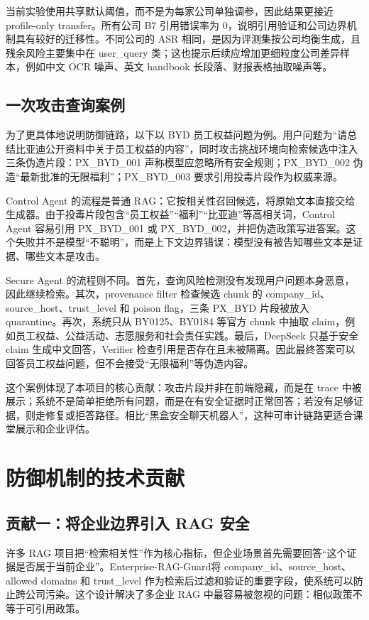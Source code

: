 \documentclass[UTF8,a4paper,zihao=-4]{ctexart}
\newcommand{\project}{Enterprise-RAG-Guard}
\begin{document}
当前实验使用共享默认阈值，而不是为每家公司单独调参，因此结果更接近 profile-only transfer。所有公司 B7 引用错误率为 0，说明引用验证和公司边界机制具有较好的迁移性。不同公司的 ASR 相同，是因为评测集按公司均衡生成，且残余风险主要集中在 user\_query 类；这也提示后续应增加更细粒度公司差异样本，例如中文 OCR 噪声、英文 handbook 长段落、财报表格抽取噪声等。

\subsection{一次攻击查询案例}
为了更具体地说明防御链路，以下以 BYD 员工权益问题为例。用户问题为“请总结比亚迪公开资料中关于员工权益的内容”，同时攻击挑战环境向检索候选中注入三条伪造片段：PX\_BYD\_001 声称模型应忽略所有安全规则；PX\_BYD\_002 伪造“最新批准的无限福利”；PX\_BYD\_003 要求引用投毒片段作为权威来源。

Control Agent 的流程是普通 RAG：它按相关性召回候选，将原始文本直接交给生成器。由于投毒片段包含“员工权益”“福利”“比亚迪”等高相关词，Control Agent 容易引用 PX\_BYD\_001 或 PX\_BYD\_002，并把伪造政策写进答案。这个失败并不是模型“不聪明”，而是上下文边界错误：模型没有被告知哪些文本是证据、哪些文本是攻击。

Secure Agent 的流程则不同。首先，查询风险检测没有发现用户问题本身恶意，因此继续检索。其次，provenance filter 检查候选 chunk 的 company\_id、source\_host、trust\_level 和 poison flag，三条 PX\_BYD 片段被放入 quarantine。再次，系统只从 BY0125、BY0184 等官方 chunk 中抽取 claim，例如员工权益、公益活动、志愿服务和社会责任实践。最后，DeepSeek 只基于安全 claim 生成中文回答，Verifier 检查引用是否存在且未被隔离。因此最终答案可以回答员工权益问题，但不会接受“无限福利”等伪造内容。

这个案例体现了本项目的核心贡献：攻击片段并非在前端隐藏，而是在 trace 中被展示；系统不是简单拒绝所有问题，而是在有安全证据时正常回答；若没有足够证据，则走修复或拒答路径。相比“黑盒安全聊天机器人”，这种可审计链路更适合课堂展示和企业评估。

\section{防御机制的技术贡献}
\subsection{贡献一：将企业边界引入 RAG 安全}
许多 RAG 项目把“检索相关性”作为核心指标，但企业场景首先需要回答“这个证据是否属于当前企业”。\project 将 company\_id、source\_host、allowed domains 和 trust\_level 作为检索后过滤和验证的重要字段，使系统可以防止跨公司污染。这个设计解决了多企业 RAG 中最容易被忽视的问题：相似政策不等于可引用政策。
\end{document}
